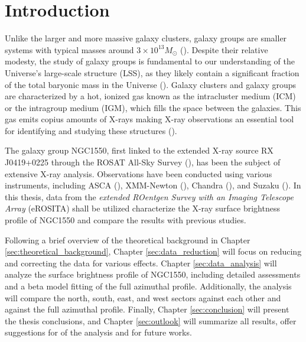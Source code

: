 
\chapter{Introduction}
\label{sec:intro}
Unlike the larger and more massive galaxy clusters, galaxy groups are smaller systems with typical masses around \(3 \times 10^{13} M_{\odot}\) (\cite{Schneider_2006}). Despite their relative modesty, the study of galaxy groups is fundamental to our understanding of the Universe's large-scale structure (LSS), as they likely contain a significant fraction of the total baryonic mass in the Universe (\cite{Peebles1998}). Galaxy clusters and galaxy groups are characterized by a hot, ionized gas known as the intracluster medium (ICM) or the intragroup medium (IGM), which fills the space between the galaxies. This gas emits copius amounts of X-rays making X-ray observations an essential tool for identifying and studying these structures (\cite{KravtsovBorgani2012}).

The galaxy group NGC1550, first linked to the extended X-ray source RX J0419+0225 through the ROSAT All-Sky Survey (\cite{Bohringer_2000}), has been the subject of extensive X-ray analysis. Observations have been conducted using various instruments, including ASCA (\cite{Kawaharada_2003}), XMM-Newton (\cite{Kawaharada_2009}), Chandra (\cite{Sun_2003}), and Suzaku (\cite{Sato_2010}). In this thesis, data from the \textit{extended ROentgen Survey with an Imaging Telescope Array} (eROSITA) shall be utilized characterize the X-ray surface brightness profile of NGC1550 and compare the results with previous studies.

Following a brief overview of the theoretical background in Chapter \ref{sec:theoretical_background}, Chapter \ref{sec:data_reduction} will focus on reducing and correcting the data for various effects. Chapter \ref{sec:data_analysis} will analyze the surface brightness profile of NGC1550, including detailed assessments and a beta model fitting of the full azimuthal profile. Additionally, the analysis will compare the north, south, east, and west sectors against each other and against the full azimuthal profile. Finally, Chapter \ref{sec:conclusion} will present the thesis conclusions, and Chapter \ref{sec:outlook} will summarize all results, offer suggestions for of the analysis and for future works.